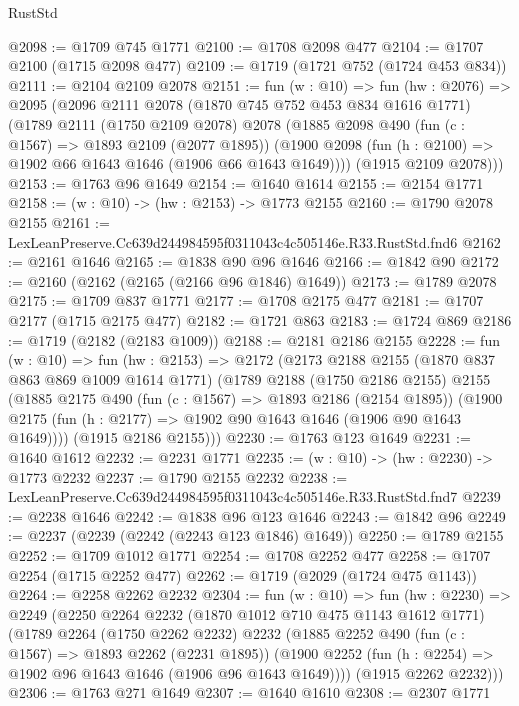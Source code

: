 \begin{lexlean}{RustStd}
\begin{coremodule}
@2098 := @1709 @745 @1771
@2100 := @1708 @2098 @477
@2104 := @1707 @2100 (@1715 @2098 @477)
@2109 := @1719 (@1721 @752 (@1724 @453 @834))
@2111 := @2104 @2109 @2078
@2151 := fun (w : @10) =>
  fun (hw : @2076) =>
  @2095
    (@2096
      @2111
      @2078
      (@1870 @745 @752 @453 @834 @1616 @1771)
      (@1789
        @2111
        (@1750 @2109 @2078)
        @2078
        (@1885
          @2098
          @490
          (fun (c : @1567) => @1893 @2109 (@2077 @1895))
          (@1900 @2098 (fun (h : @2100) => @1902 @66 @1643 @1646 (@1906 @66 @1643 @1649))))
        (@1915 @2109 @2078)))
@2153 := @1763 @96 @1649
@2154 := @1640 @1614
@2155 := @2154 @1771
@2158 := (w : @10) -> (hw : @2153) -> @1773 @2155
@2160 := @1790 @2078 @2155
@2161 := LexLeanPreserve.Cc639d244984595f0311043c4c505146e.R33.RustStd.fnd6
@2162 := @2161 @1646
@2165 := @1838 @90 @96 @1646
@2166 := @1842 @90
@2172 := @2160 (@2162 (@2165 (@2166 @96 @1846) @1649))
@2173 := @1789 @2078
@2175 := @1709 @837 @1771
@2177 := @1708 @2175 @477
@2181 := @1707 @2177 (@1715 @2175 @477)
@2182 := @1721 @863
@2183 := @1724 @869
@2186 := @1719 (@2182 (@2183 @1009))
@2188 := @2181 @2186 @2155
@2228 := fun (w : @10) =>
  fun (hw : @2153) =>
  @2172
    (@2173
      @2188
      @2155
      (@1870 @837 @863 @869 @1009 @1614 @1771)
      (@1789
        @2188
        (@1750 @2186 @2155)
        @2155
        (@1885
          @2175
          @490
          (fun (c : @1567) => @1893 @2186 (@2154 @1895))
          (@1900 @2175 (fun (h : @2177) => @1902 @90 @1643 @1646 (@1906 @90 @1643 @1649))))
        (@1915 @2186 @2155)))
@2230 := @1763 @123 @1649
@2231 := @1640 @1612
@2232 := @2231 @1771
@2235 := (w : @10) -> (hw : @2230) -> @1773 @2232
@2237 := @1790 @2155 @2232
@2238 := LexLeanPreserve.Cc639d244984595f0311043c4c505146e.R33.RustStd.fnd7
@2239 := @2238 @1646
@2242 := @1838 @96 @123 @1646
@2243 := @1842 @96
@2249 := @2237 (@2239 (@2242 (@2243 @123 @1846) @1649))
@2250 := @1789 @2155
@2252 := @1709 @1012 @1771
@2254 := @1708 @2252 @477
@2258 := @1707 @2254 (@1715 @2252 @477)
@2262 := @1719 (@2029 (@1724 @475 @1143))
@2264 := @2258 @2262 @2232
@2304 := fun (w : @10) =>
  fun (hw : @2230) =>
  @2249
    (@2250
      @2264
      @2232
      (@1870 @1012 @710 @475 @1143 @1612 @1771)
      (@1789
        @2264
        (@1750 @2262 @2232)
        @2232
        (@1885
          @2252
          @490
          (fun (c : @1567) => @1893 @2262 (@2231 @1895))
          (@1900 @2252 (fun (h : @2254) => @1902 @96 @1643 @1646 (@1906 @96 @1643 @1649))))
        (@1915 @2262 @2232)))
@2306 := @1763 @271 @1649
@2307 := @1640 @1610
@2308 := @2307 @1771

\end{coremodule}
\end{lexlean}
